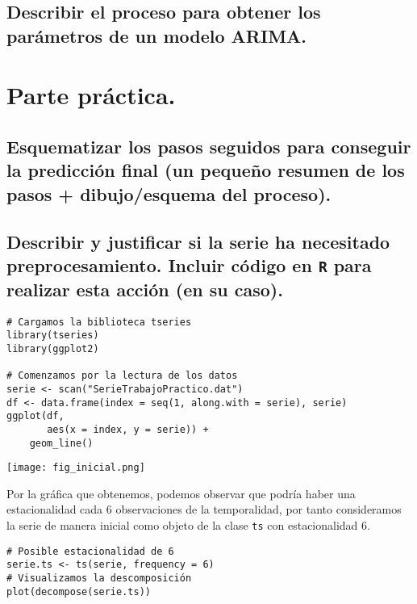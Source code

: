 \documentclass[11pt]{article}
\begin{document}
\subsection{Describir el proceso para obtener los parámetros de un modelo ARIMA.}
\label{sec:org4a90804}


\section{Parte práctica.}
\label{sec:orgb300e90}
\subsection{Esquematizar los pasos seguidos para conseguir la predicción final (un pequeño resumen de los pasos + dibujo/esquema del proceso).}
\label{sec:org2e86446}



\subsection{Describir y justificar si la serie ha necesitado preprocesamiento. Incluir código en \texttt{R} para realizar esta acción (en su caso).}
\label{sec:org20fe0c6}


\begin{verbatim}
# Cargamos la biblioteca tseries
library(tseries)
library(ggplot2)

# Comenzamos por la lectura de los datos 
serie <- scan("SerieTrabajoPractico.dat")
df <- data.frame(index = seq(1, along.with = serie), serie)
ggplot(df,
       aes(x = index, y = serie)) +
    geom_line()
\end{verbatim}

\begin{center}
\texttt{[image: fig\_inicial.png]}
\end{center}

Por la gráfica que obtenemos, podemos observar que podría haber una
estacionalidad cada 6 observaciones de la temporalidad, por tanto
consideramos la serie de manera inicial como objeto de la clase \texttt{ts}
con estacionalidad 6.

\begin{verbatim}
# Posible estacionalidad de 6
serie.ts <- ts(serie, frequency = 6)
# Visualizamos la descomposición
plot(decompose(serie.ts))
\end{verbatim}
\end{document}

